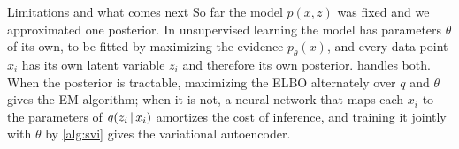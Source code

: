 \begin{notebox}{Limitations and what comes next}
So far the model $p(x,z)$ was fixed and we approximated one posterior. In unsupervised learning the model has parameters $\theta$ of its own, to be fitted by maximizing the evidence $p_\theta(x)$, and every data point $x_i$ has its own latent variable $z_i$ and therefore its own posterior.  handles both. When the posterior is tractable, maximizing the ELBO alternately over $q$ and $\theta$ gives the EM algorithm; when it is not, a neural network that maps each $x_i$ to the parameters of $q(z_i\,|\, x_i)$ amortizes the cost of inference, and training it jointly with $\theta$ by \cref{alg:svi} gives the variational autoencoder.
\end{notebox}
